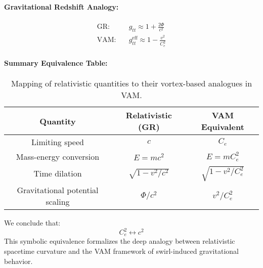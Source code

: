 \documentclass[11pt]{article}
\begin{document}
\paragraph{Gravitational Redshift Analogy:}
\begin{align*}
    \text{GR:}\quad & g_{tt} \approx 1 + \frac{2\Phi}{c^2} \\
    \text{VAM:}\quad & g_{tt}^{\text{eff}} \approx 1 - \frac{v^2}{C_e^2}
\end{align*}

\paragraph{Summary Equivalence Table:}
\begin{table}[H]
    \centering
    \renewcommand{\arraystretch}{1.3}
    \begin{tabular}{|c|c|c|}
        \hline
        \textbf{Quantity} & \textbf{Relativistic (GR)} & \textbf{VAM Equivalent} \\
        \hline
        Limiting speed & \( c \) & \( C_e \) \\
        Mass-energy conversion & \( E = mc^2 \) & \( E = m C_e^2 \) \\
        Time dilation & \( \sqrt{1 - v^2/c^2} \) & \( \sqrt{1 - v^2/C_e^2} \) \\
        Gravitational potential scaling & \( \Phi/c^2 \) & \( v^2/C_e^2 \) \\
        \hline
    \end{tabular}
    \caption{Mapping of relativistic quantities to their vortex-based analogues in VAM.}
\end{table}

\noindent
We conclude that:
\[
    \boxed{C_e^2 \longleftrightarrow c^2}
\]
This symbolic equivalence formalizes the deep analogy between relativistic spacetime curvature and the VAM framework of swirl-induced gravitational behavior.
\end{document}
